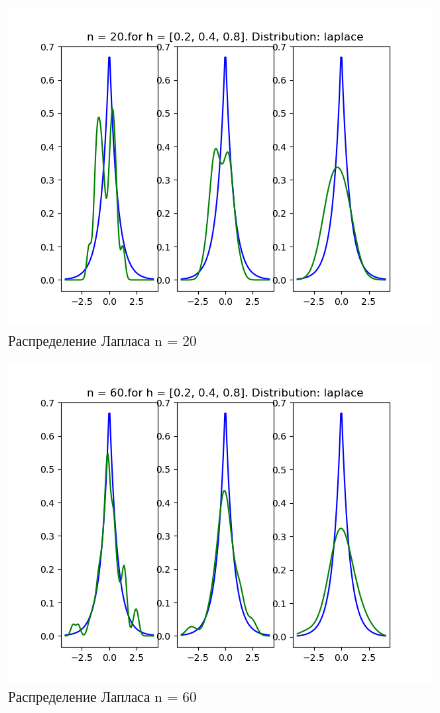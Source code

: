 \documentclass[a4]{article}
\begin{document}
\begin{center}
\begin{figure}[h!]
			\includegraphics[width=\textwidth]{laplaceker20.png}
			\caption[Распределение Лапласа n = 20]{Распределение Лапласа n = 20}
		\end{figure}
		\newpage
		\begin{figure}[h!]
			\includegraphics[width=\textwidth]{laplaceker60.png}
			\caption[Распределение Лапласа n = 60]{Распределение Лапласа n = 60}
		\end{figure}
		\newpage
		\begin{figure}[h!]

\end{figure}
\end{center}
\end{document}
